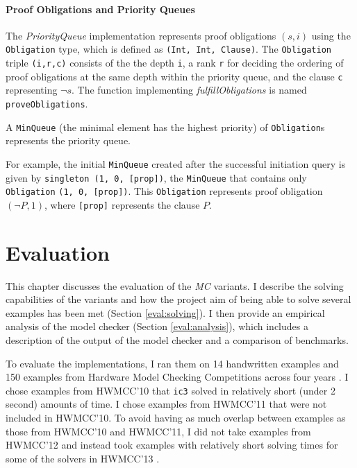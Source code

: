 \documentclass[12pt,a4paper,twoside,openright]{report}
\begin{document}
{{\subsubsection{Proof Obligations and Priority Queues}

The {\it PriorityQueue} implementation represents proof obligations $(s,i)$ using the
\verb,Obligation, type, which is defined as \verb.(Int, Int, Clause)..
The \verb,Obligation, triple
\verb.(i,r,c). consists of the the depth \verb,i,, a
rank \verb,r, for deciding the ordering of proof obligations at the same depth within the priority
queue, and the clause \verb,c, representing $\neg s$. The
function implementing {\it fulfillObligations} is named \verb,proveObligations,.

A \verb,MinQueue, (the minimal element has the highest priority) of \verb,Obligation,s
represents the priority queue.

For example, the initial \verb,MinQueue, created after the successful initiation query
is given by \verb.singleton (1, 0, [prop])., the \verb,MinQueue, that
contains only \verb,Obligation, \verb.(1, 0, [prop]).. This \verb,Obligation, represents proof obligation
$(\neg P,1)$, where \verb,[prop], represents the clause $P$.

\chapter{Evaluation}
\label{eval}

This chapter discusses the evaluation of the \emph{MC} variants.
I describe the solving capabilities of the variants
and how the project aim of being able to solve several examples has been met
(Section \ref{eval:solving}). I then provide an empirical analysis of the
model checker (Section \ref{eval:analysis}), which includes a description of
the output of the model checker and a comparison of benchmarks.

To evaluate the implementations, I ran them
on 14 handwritten examples and 150 examples from
Hardware Model Checking Competitions across four years \cite{hwmcc10, hwmcc11, hwmcc13}.
I chose examples from HWMCC'10 that \verb,ic3, solved in relatively short
(under 2 second) amounts of time. I chose examples from HWMCC'11 that were
not included in HWMCC'10.
To avoid having as much overlap between examples as those from HWMCC'10 and HWMCC'11,
I did not take examples from HWMCC'12 and instead took examples
with relatively short solving times for some of the solvers in HWMCC'13
\cite{hwmcc13}.

}}
\end{document}
